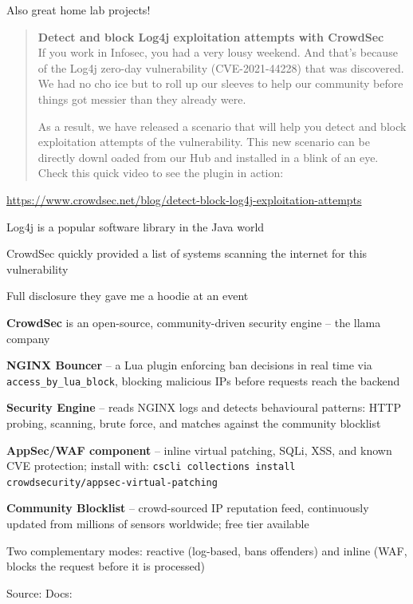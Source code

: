 \documentclass[Screen16to9,17pt]{foils}
\begin{document}
Also great home lab projects!



\begin{quote}
{\bf Detect and block Log4j exploitation attempts with CrowdSec}\\
If you work in Infosec, you had a very lousy weekend. And that’s because of the Log4j zero-day vulnerability (CVE-2021-44228) that was discovered. We had no cho
ice but to roll up our sleeves to help our community before things got messier than they already were.

As a result, we have released a scenario that will help you detect and block exploitation attempts of the vulnerability. This new scenario can be directly downl
oaded from our Hub and installed in a blink of an eye. Check this quick video to see the plugin in action:
\end{quote}

\url{https://www.crowdsec.net/blog/detect-block-log4j-exploitation-attempts}


\begin{list2}
\item Log4j is a popular software library in the Java world
\item CrowdSec quickly provided a list of systems scanning the internet for this vulnerability\\
\item Full disclosure they gave me a hoodie at an event \smiley
\end{list2}




\begin{list2}
\item {\bf CrowdSec} is an open-source, community-driven security engine -- the llama company 
\item {\bf NGINX Bouncer} -- a Lua plugin enforcing ban decisions in real time via \verb+access_by_lua_block+,
blocking malicious IPs before requests reach the backend
\item {\bf Security Engine} -- reads NGINX logs and detects behavioural patterns: HTTP probing,
scanning, brute force, and matches against the community blocklist
\item {\bf AppSec/WAF component} -- inline virtual patching, SQLi, XSS, and known CVE protection;
install with:
\verb+cscli collections install crowdsecurity/appsec-virtual-patching+
\item {\bf Community Blocklist} -- crowd-sourced IP reputation feed, continuously updated from
millions of sensors worldwide; free tier available
\item Two complementary modes: reactive (log-based, bans offenders) and
inline (WAF, blocks the request before it is processed)
\end{list2}
Source: Docs: 
\end{document}
